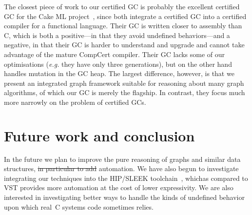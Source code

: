 \documentclass[acmsmall,screen]{acmart}  %
\newcommand\hide[1]{}
\providecommand{\DIFadd}[1]{{\protect\color{blue}\uwave{#1}}} %
\providecommand{\DIFdel}[1]{{\protect\color{red}\sout{#1}}}                      %
\providecommand{\DIFaddbegin}{} %
\providecommand{\DIFaddend}{} %
\providecommand{\DIFdelbegin}{} %
\providecommand{\DIFdelend}{} %
\newcommand{\DIFscaledelfig}{0.5}
\newlength{\DIFdelgraphicswidth} %
\newlength{\DIFdelgraphicsheight} %
\newcommand{\DIFaddincludegraphics}[2][]{{\color{blue}\fbox{\DIFOincludegraphics[#1]{#2}}}} %
\newcommand{\DIFdelincludegraphics}[2][]{%
\sbox{\DIFdelgraphicsbox}{\DIFOincludegraphics[#1]{#2}}%
\settoboxwidth{\DIFdelgraphicswidth}{\DIFdelgraphicsbox} %
\settoboxtotalheight{\DIFdelgraphicsheight}{\DIFdelgraphicsbox} %
\scalebox{\DIFscaledelfig}{%
\parbox[b]{\DIFdelgraphicswidth}{\usebox{\DIFdelgraphicsbox}\\[-\baselineskip] \rule{\DIFdelgraphicswidth}{0em}}\llap{\resizebox{\DIFdelgraphicswidth}{\DIFdelgraphicsheight}{%
\setlength{\unitlength}{\DIFdelgraphicswidth}%
\begin{picture}(1,1)%
\thicklines\linethickness{2pt} %
{\color[rgb]{1,0,0}\put(0,0){\framebox(1,1){}}}%
{\color[rgb]{1,0,0}\put(0,0){\line( 1,1){1}}}%
{\color[rgb]{1,0,0}\put(0,1){\line(1,-1){1}}}%
\end{picture}%
}\hspace*{3pt}}} %
} %
\DeclareRobustCommand{\DIFaddbegin}{\DIFOaddbegin \let\includegraphics\DIFaddincludegraphics} %
\DeclareRobustCommand{\DIFaddend}{\DIFOaddend \let\includegraphics\DIFOincludegraphics} %
\DeclareRobustCommand{\DIFdelbegin}{\DIFOdelbegin \let\includegraphics\DIFdelincludegraphics} %
\DeclareRobustCommand{\DIFdelend}{\DIFOaddend \let\includegraphics\DIFOincludegraphics} %
\begin{document}
The closest piece of work to our certified GC is probably the excellent certified GC
for the Cake ML project~\cite{cakemlgc}, since both integrate a certified GC into 
a certified compiler for a functional language.  Their GC is written closer to assembly 
than C, which is both a positive---in that they avoid undefined behaviors---and a negative, 
in that their GC is harder to understand and upgrade and cannot take advantage of the
mature CompCert compiler.  Their GC lacks some of our optimisations (\emph{e.g.} they have 
only three generations), but on the other hand handles mutation in the GC heap.  The largest 
difference, however, is that we present an integrated graph framework suitable for reasoning 
about many graph algorithms, of which our GC is merely the flagship.  In contrast, they focus 
much more narrowly on the problem of certified GCs.

\section{Future work and conclusion}
\label{sec:future}
\label{sec:conclusion}
In the future we plan to improve the pure reasoning of graphs and
similar data structures, \DIFdelbegin \DIFdel{in particular to add }\DIFdelend \DIFaddbegin \DIFadd{with a particular focus on }\DIFaddend automation.  We have
also begun to investigate integrating our techniques into the 
HIP/SLEEK toolchain~\cite{chin:hipsleek}, which\DIFaddbegin \DIFadd{, }\DIFaddend as compared to VST\DIFaddbegin \DIFadd{, }
\DIFaddend provides more automation at the cost of lower expressivity.  We
are also interested in investigating better ways to handle the
kinds of undefined behavior upon which real~C systems code sometimes
relies.

\hide{\color{magenta}We are in the process of verifying a garbage
collector for the ``CertiCoq'' project, which is building
a certified compiler from Gallina to Clight. We would like to investigate
using our externally verified lemmas in HIP/SLEEK to verify code such as fast
exponentiation and more graph algorithms. We also would like to make
the interface between Coq and H/S simpler and cleaner.
One final direction we would like to investigate is using our new
connection to Coq to have H/S output certificates as it
verifies programs so that the system becomes more trustworthy.}
\end{document}
